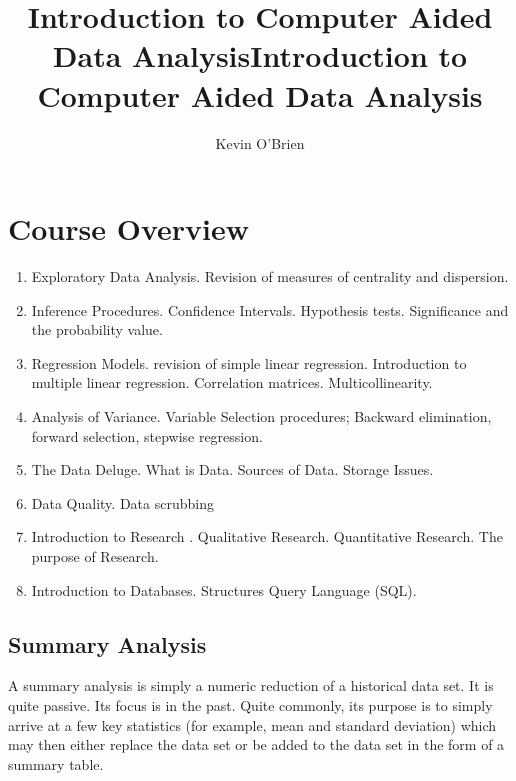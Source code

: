 \documentclass[12pt, a4paper]{report}
\title{Introduction to Computer Aided Data Analysis}
\author{ } \date{ }
\begin{document}
\author{Kevin O'Brien}
\title{Introduction to Computer Aided Data Analysis}




\newpage


\section{Course Overview}
\begin{enumerate}
\item Exploratory Data Analysis. Revision of measures of centrality and dispersion.
\item Inference Procedures. Confidence Intervals. Hypothesis tests. Significance and the probability value.
\item Regression Models. revision of simple linear regression. Introduction to multiple linear regression. Correlation matrices. Multicollinearity.
\item Analysis of Variance. Variable Selection procedures; Backward elimination, forward selection, stepwise regression.
\item The Data Deluge. What is Data. Sources of Data. Storage Issues.
\item Data Quality. Data scrubbing
\item Introduction to Research . Qualitative Research. Quantitative Research. The purpose of Research.
\item Introduction to Databases. Structures Query Language (SQL).

\end{enumerate}
\newpage
\tableofcontents
\newpage




\subsection{Summary Analysis}
A summary analysis is simply a numeric reduction of a historical data set. It is quite passive. Its focus is in the past. Quite commonly, its purpose is to simply arrive at a few key statistics (for example, mean and standard deviation) which may then either replace the data set or be added to the data set in the form of a summary table.
\end{document}
